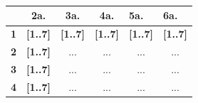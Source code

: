 \begin{frame}
  \frametitle{}
  \framesubtitle{}

\begin{table}[]
\begin{tabular}{|c|c|c|c|c|c|}
\hline
{\color[HTML]{00009B} }                                 & {\color[HTML]{CB0000} \textbf{2a.}}                             & {\color[HTML]{CB0000} \textbf{3a.}}        & {\color[HTML]{CB0000} \textbf{4a.}}        & \multicolumn{1}{l|}{{\color[HTML]{CB0000} \textbf{5a.}}}        & \multicolumn{1}{l|}{{\color[HTML]{CB0000} \textbf{6a.}}}        \\ \hline
{\color[HTML]{303498} \textbf{1}}                       & {\color[HTML]{009901} \textbf{{[}1..7{]}}}                      & {\color[HTML]{009901} \textbf{{[}1..7{]}}} & {\color[HTML]{009901} \textbf{{[}1..7{]}}} & \multicolumn{1}{l|}{{\color[HTML]{009901} \textbf{{[}1..7{]}}}} & \multicolumn{1}{l|}{{\color[HTML]{009901} \textbf{{[}1..7{]}}}} \\ \hline
{\color[HTML]{303498} \textbf{2}}                       & {\color[HTML]{009901} \textbf{{[}1..7{]}}}                      & ...                                        & ...                                        & ...                                                             & ...                                                             \\ \hline
{\color[HTML]{303498} \textbf{3}}                       & {\color[HTML]{009901} \textbf{{[}1..7{]}}}                      & ...                                        & ...                                        & ...                                                             & ...                                                             \\ \hline
\multicolumn{1}{|l|}{{\color[HTML]{303498} \textbf{4}}} & \multicolumn{1}{l|}{{\color[HTML]{009901} \textbf{{[}1..7{]}}}} & ...                                        & ...                                        & ...                                                             & ...                                                             \\ \hline
\end{tabular}
\end{table}

\end{frame}




